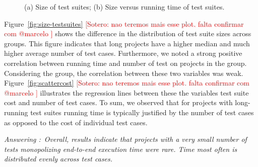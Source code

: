 \documentclass[10pt,journal,compsoc]{IEEEtran}
\begin{document}
\begin{figure}[t!]%
  \centering
  \qquad
  \vspace{-2mm}
  \caption{\label{fig:time-versus-size}(a) Size of test suites; (b)
    Size versus running time of test suites.}%
  \vspace{-5mm}
\end{figure}

Figure~\ref{fig:size-testsuites}  \textcolor{red}{[Sotero:  nao teremos mais esse plot. falta confirmar com @marcelo ]}  shows the difference in the
distribution of test suite sizes across groups.  This figure indicates
that long projects have a higher median and much higher average number of test cases.
Furthermore, we noted a strong positive correlation between running
time and number of test on projects in the \longg{} group.
Considering the \medg{} group, the correlation between these two
variables was weak.
Figure~\ref{fig:scattercost} \textcolor{red}{[Sotero:  nao teremos mais esse plot. falta confirmar com @marcelo ]} illustrates the regression lines between
these the variables test suite cost and number of test cases.
To sum, we observed that for projects with long-running test suites
running time is typically
justified by the number of test cases as opposed to the cost of individual test cases.

\begin{mdframed}
  \noindent\textit{Answering \numRQFeasibilityTwo{}:}~\emph{Overall, results indicate that
  projects with a very small number of tests monopolizing end-to-end
  execution time were rare. Time most often is distributed evenly
  across test cases.}
\end{mdframed}
\end{document}
